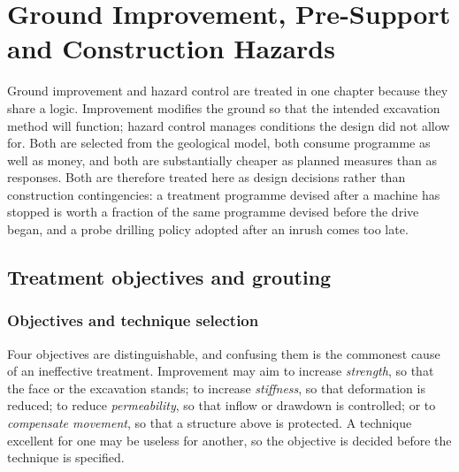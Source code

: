 \chapter{Ground Improvement, Pre-Support and Construction Hazards}
\label{ch:ground-improvement}

Ground improvement and hazard control are treated in one chapter because they
share a logic. Improvement modifies the ground so that the intended excavation
method will function; hazard control manages conditions the design did not
allow for. Both are selected from the geological model, both consume programme
as well as money, and both are substantially cheaper as planned
measures than as responses. Both are therefore treated here as design
decisions rather than construction contingencies: a treatment programme
devised after a machine has stopped is worth a fraction of the same programme
devised before the drive began, and a probe drilling policy adopted after an
inrush comes too late.

\section{Treatment objectives and grouting}
\label{sec:treatment-grouting}

\subsection{Objectives and technique selection}
\label{sec:objectives-selection}

Four objectives are distinguishable, and confusing them is the commonest cause
of an ineffective treatment. Improvement may aim to increase \emph{strength},
so that the face or the excavation stands; to increase \emph{stiffness}, so
that deformation is reduced; to reduce \emph{permeability}, so that inflow or
drawdown is controlled; or to \emph{compensate movement}, so that a structure
above is protected. A technique excellent for one may be useless for another,
so the objective is decided before the technique is specified.

